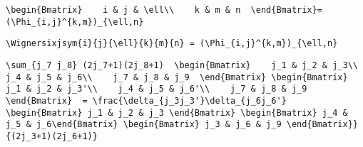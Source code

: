 \newsavebox\BWMA
\begin{lrbox}{\BWMA}
 \begin{minipage}[t]{0.82\textwidth}
  \lstinline[language={[latex]TeX},mathescape,breaklines=true]""
 \end{minipage}
\end{lrbox}
\newsavebox\BXT
\begin{lrbox}{\BXT}
 \begin{minipage}[t]{0.82\textwidth}
  \lstinline[language={[latex]TeX},mathescape,breaklines=true]"\begin{Bmatrix}    i & j & \ell\\    k & m & n  \end{Bmatrix}= (\Phi_{i,j}^{k,m})_{\ell,n}"
 \end{minipage}
\end{lrbox}
\newsavebox\BXST
\begin{lrbox}{\BXST}
 \begin{minipage}[t]{0.82\textwidth}
  \lstinline[language={[latex]TeX},mathescape,breaklines=true]"\Wignersixjsym{i}{j}{\ell}{k}{m}{n} = (\Phi_{i,j}^{k,m})_{\ell,n}"
 \end{minipage}
\end{lrbox}
\newsavebox\BXMM
\begin{lrbox}{\BXMM}
 \begin{minipage}[t]{0.82\textwidth}
  \lstinline[language={[latex]TeX},mathescape,breaklines=true]""
 \end{minipage}
\end{lrbox}
\newsavebox\BXMA
\begin{lrbox}{\BXMA}
 \begin{minipage}[t]{0.82\textwidth}
  \lstinline[language={[latex]TeX},mathescape,breaklines=true]""
 \end{minipage}
\end{lrbox}
\newsavebox\BYT
\begin{lrbox}{\BYT}
 \begin{minipage}[t]{0.82\textwidth}
  \lstinline[language={[latex]TeX},mathescape,breaklines=true]"\sum_{j_7 j_8} (2j_7+1)(2j_8+1)  \begin{Bmatrix}    j_1 & j_2 & j_3\\    j_4 & j_5 & j_6\\    j_7 & j_8 & j_9  \end{Bmatrix} \begin{Bmatrix}    j_1 & j_2 & j_3'\\    j_4 & j_5 & j_6'\\    j_7 & j_8 & j_9  \end{Bmatrix}  = \frac{\delta_{j_3j_3'}\delta_{j_6j_6'} \begin{Bmatrix} j_1 & j_2 & j_3 \end{Bmatrix} \begin{Bmatrix} j_4 & j_5 & j_6\end{Bmatrix} \begin{Bmatrix} j_3 & j_6 & j_9 \end{Bmatrix}}         {(2j_3+1)(2j_6+1)}"
 \end{minipage}
\end{lrbox}

